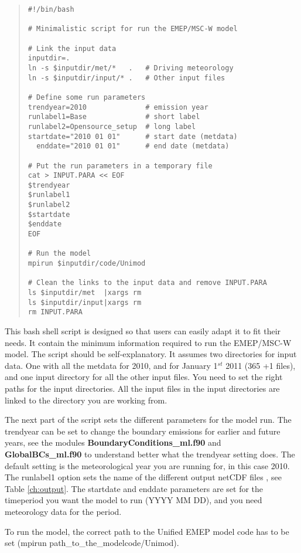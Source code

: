 \begin{quote}
\begin{verbatim}
#!/bin/bash

# Minimalistic script for run the EMEP/MSC-W model

# Link the input data
inputdir=.
ln -s $inputdir/met/*   .   # Driving meteorology
ln -s $inputdir/input/* .   # Other input files

# Define some run parameters
trendyear=2010              # emission year
runlabel1=Base              # short label
runlabel2=Opensource_setup  # long label
startdate="2010 01 01"      # start date (metdata)
  enddate="2010 01 01"      # end date (metdata)

# Put the run parameters in a temporary file
cat > INPUT.PARA << EOF
$trendyear
$runlabel1
$runlabel2
$startdate
$enddate
EOF

# Run the model
mpirun $inputdir/code/Unimod

# Clean the links to the input data and remove INPUT.PARA
ls $inputdir/met  |xargs rm
ls $inputdir/input|xargs rm
rm INPUT.PARA

\end{verbatim}
\end{quote}
This bash shell script is designed so that users can easily 
adapt it to fit their needs. It contain the minimum information 
required to run the EMEP/MSC-W model. 
The script should be self-explanatory. It assumes two directories for input data. 
One with all the metdata for 2010, and for January 1$^{st}$ 2011 (365 +1 files), 
and one input directory for all the other input files. You need to set the right paths 
for the input directories.  
All the input files in the input directories are linked to the directory you are working from. 
  

The next part of the script sets the different parameters for the model run. 
The trendyear can be set to change the boundary emissions for 
earlier and future years, see the modules {\bf BoundaryConditions\_ml.f90 } 
and {\bf GlobalBCs\_ml.f90 } to understand better what the trendyear 
setting does. The default setting is the meteorological year you are running for, 
in this case 2010. 
The runlabel1 option sets the name of the different output netCDF 
files , see Table \ref{ch:output}. 
The startdate and enddate parameters are set for the timeperiod you want the model 
to run (YYYY MM DD), and you need meteorology data for the period.

To run the model, the correct path  to the Unified EMEP model code 
has to be set (mpirun path\_to\_the\_modelcode/Unimod).  

